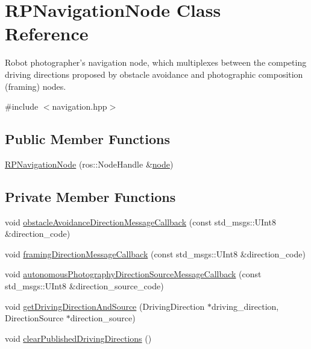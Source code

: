 \hypertarget{class_r_p_navigation_node}{\section{\-R\-P\-Navigation\-Node \-Class \-Reference}
\label{class_r_p_navigation_node}
}


\-Robot photographer's navigation node, which multiplexes between the competing driving directions proposed by obstacle avoidance and photographic composition (framing) nodes.  




{\ttfamily \#include $<$navigation.\-hpp$>$}

\subsection*{\-Public \-Member \-Functions}
\begin{DoxyCompactItemize}
\item 
\hyperlink{class_r_p_navigation_node_a589401d5b3acfbd3048a34e9c7a67784}{\-R\-P\-Navigation\-Node} (ros\-::\-Node\-Handle \&\hyperlink{class_r_p_navigation_node_aed678dff310085f48bed11c3a0daaacc}{node})
\end{DoxyCompactItemize}
\subsection*{\-Private \-Member \-Functions}
\begin{DoxyCompactItemize}
\item 
void \hyperlink{class_r_p_navigation_node_a8472f998d66d5bdeef49aab1f04f8bc4}{obstacle\-Avoidance\-Direction\-Message\-Callback} (const std\-\_\-msgs\-::\-U\-Int8 \&direction\-\_\-code)
\item 
void \hyperlink{class_r_p_navigation_node_ab6596892e66751a8aaf62886ea9deefe}{framing\-Direction\-Message\-Callback} (const std\-\_\-msgs\-::\-U\-Int8 \&direction\-\_\-code)
\item 
void \hyperlink{class_r_p_navigation_node_ab5919af0a8b4d1e866f127649f515b45}{autonomous\-Photography\-Direction\-Source\-Message\-Callback} (const std\-\_\-msgs\-::\-U\-Int8 \&direction\-\_\-source\-\_\-code)
\item 
void \hyperlink{class_r_p_navigation_node_a15e612f3e2933a93854b25aff498c1a1}{get\-Driving\-Direction\-And\-Source} (\-Driving\-Direction $\ast$driving\-\_\-direction, \-Direction\-Source $\ast$direction\-\_\-source)
\item 
void \hyperlink{class_r_p_navigation_node_a5d5dc9a15cb4d24f6b04382f4452ded1}{clear\-Published\-Driving\-Directions} ()
\end{DoxyCompactItemize}
